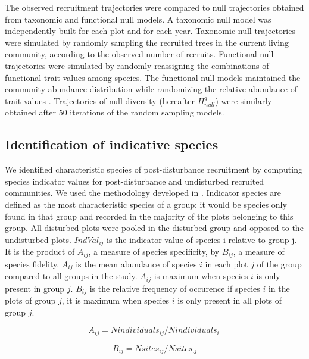 \documentclass[fleqn,10pt]{ArtEcoFoG} %
\begin{document}
The observed recruitment trajectories were compared to null trajectories
obtained from taxonomic and functional null models. A taxonomic null
model was independently built for each plot and for each year. Taxonomic
null trajectories were simulated by randomly sampling the recruited
trees in the current living community, according to the observed number
of recruits. Functional null trajectories were simulated by randomly
reassigning the combinations of functional trait values among species.
The functional null models maintained the community abundance
distribution while randomizing the relative abundance of trait values
\citep{Mason2013}. Trajectories of null diversity (hereafter
\(H^q_{null}\)) were similarly obtained after 50 iterations of the
random sampling models.

\subsection{Identification of indicative
species}\label{identification-of-indicative-species}

We identified characteristic species of post-disturbance recruitment by
computing species indicator values for post-disturbance and undisturbed
recruited communities. We used the methodology developed in
\citet{Dufrene1997}. Indicator species are defined as the most
characteristic species of a group: it would be species only found in
that group and recorded in the majority of the plots belonging to this
group. All disturbed plots were pooled in the disturbed group and
opposed to the undisturbed plots. \(IndVal_{ij}\) is the indicator value
of species i relative to group j. It is the product of \(A_{ij}\), a
measure of species specificity, by \(B_{ij}\), a measure of species
fidelity. \(A_{ij}\) is the mean abundance of species \(i\) in each plot
\(j\) of the group compared to all groups in the study. \(A_{ij}\) is
maximum when species \(i\) is only present in group \(j\). \(B_{ij}\) is
the relative frequency of occurence if species \(i\) in the plots of
group \(j\), it is maximum when species \(i\) is only present in all
plots of group \(j\).

\begin{equation}
A_{ij} = Nindividuals_{ij} / Nindividuals_{i.}
\end{equation}

\begin{equation}
B_{ij} = Nsites_{ij} / Nsites_{.j}
\end{equation}
\end{document}

